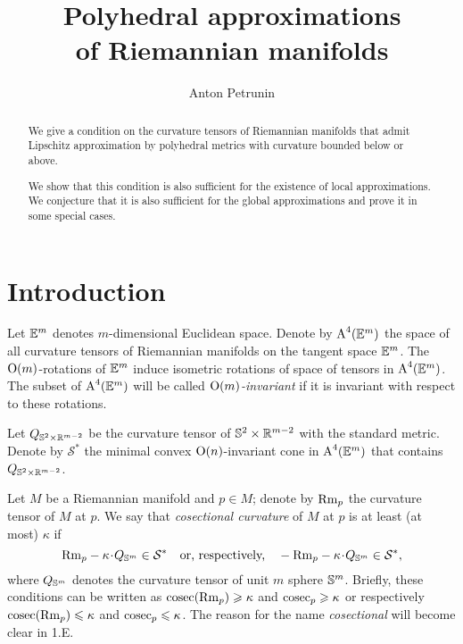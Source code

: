 \documentclass{article}
\begin{document}

\title{Polyhedral approximations\\of Riemannian manifolds}
\author{Anton Petrunin}
\date{}
\maketitle


\begin{abstract} 
We give a condition on the curvature tensors of Riemannian manifolds that admit Lipschitz approximation by polyhedral metrics with curvature bounded below or above.

We show that this condition is also sufficient for the existence of local approximations.
We conjecture that it is also sufficient for the global approximations and prove it in some special cases.
\end{abstract}


\section*{Introduction}

Let $\mathbb{E}^m$ denotes  $m$-dimensional Euclidean space.
Denote by $\text{\rm A}^4(\mathbb{E}^m)$ the space of all curvature tensors of Riemannian manifolds on the tangent space $\mathbb{E}^m$.
The $\text{\rm O}(m)$-rotations of $\mathbb{E}^m$ induce isometric rotations of space of tensors in $\text{\rm A}^4(\mathbb{E}^m)$.
The subset of $\text{\rm A}^4(\mathbb{E}^m)$ will be called \emph{$\text{\rm O}(m)$-invariant} if it is invariant with respect to these rotations.

Let $Q_{\mathbb{S}^2\times \mathbb{R}^{m-2}}$ be the curvature tensor of $\mathbb{S}^2\times \mathbb{R}^{m-2}$ with the standard metric.
Denote by $\mathcal{S}^*$ the minimal convex $\text{\rm O}(n)$-invariant cone in $\text{\rm A}^4(\mathbb{E}^m)$ that contains $Q_{\mathbb{S}^2\times \mathbb{R}^{m-2}}$.

Let $M$ be a Riemannian manifold and $p\in M$;
denote by $\mathrm{Rm}_p$ the curvature tensor of $M$ at $p$.
We say that \emph{cosectional curvature} of $M$ at $p$ is at least (at most) $\kappa$
if \[\Rm_p-\kappa\cdot Q_{\SS^m}\in\mathcal{S}^* \quad\text{or, respectively,}\quad-\Rm_p-\kappa \cdot Q_{\SS^m}\in\mathcal{S}^*,\]
where $Q_{\mathbb{S}^m}$ denotes the curvature tensor of unit $m$ sphere $\mathbb{S}^m$.
Briefly, these conditions can be written as $\mathop{\rm cosec}\nolimits(\mathrm{Rm}_p)\geqslant \kappa$ and $\mathop{\rm cosec}\nolimits_p\geqslant \kappa$ or respectively $\mathop{\rm cosec}\nolimits(\mathrm{Rm}_p)\leqslant \kappa$ and $\mathop{\rm cosec}\nolimits_p\leqslant \kappa$.
The reason for the name \emph{cosectional} will become clear in 1.E.
\end{document}
